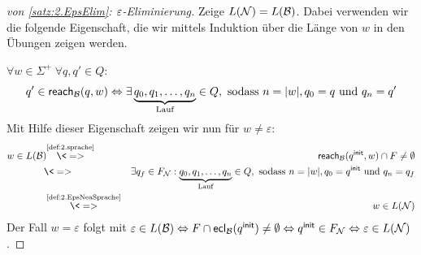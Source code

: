 \begin{proof}[von \autoref{satz:2.EpsElim}: $\varepsilon$-Eliminierung]
        Zeige $L(\mathcal{N})=L(\mathcal{B})$. Dabei verwenden wir die folgende Eigenschaft, die wir mittels Induktion über die Länge von $w$ in den Übungen zeigen werden.
        
        $\forall w\in\Sigma^+\; \forall q, q'\in Q:$
        $$q'\in\textsf{reach}_{\mathcal{B}}(q,w) \Leftrightarrow \exists \underbrace{q_0, q_1,\ldots, q_n}_{\text{Lauf}}\in Q, \text{ sodass }  n=|w|, q_0=q \text{ und } q_n=q'$$
        Mit Hilfe dieser Eigenschaft zeigen wir nun für $w \neq \varepsilon$:
        \begin{eqnarray*}
         w\in L(\B) \hspace*{-1mm}
         &\stackrel{\text{\autoref{def:2.sprache}}}{\<=>} &\reach_\B (\qinit, w)\cap F \ne\emptyset\\
         &\<=> & \exists q_f\in F_\calN: \underbrace{q_0, q_1,\ldots, q_n}_{\text{Lauf}}\in Q, \text{ sodass }  n=|w|, q_0=\qinit \text{ und } q_n=q_f\\
         &\stackrel{\text{\autoref{def:2.EpsNeaSprache}}}{\<=>} & w \in L(\calN)
        \end{eqnarray*}
        Der Fall $w = \varepsilon$ folgt mit $\varepsilon \in L(\mathcal{B}) \Leftrightarrow  F \cap \textsf{ecl}_{\mathcal{B}}(q^\mathsf{init}) \ne \emptyset \Leftrightarrow q^\mathsf{init} \in F_{\mathcal{N}} \Leftrightarrow \varepsilon \in L(\mathcal{N})$.
\end{proof}



